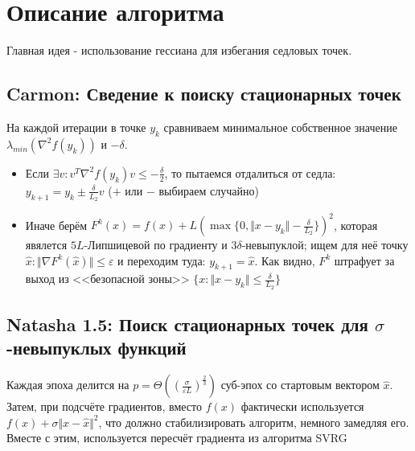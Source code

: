 \documentclass[12pt]{article}
\begin{document}
\section{Описание алгоритма}

Главная идея - использование гессиана для избегания седловых точек.

\subsection{Carmon: Сведение к поиску стационарных точек}



На каждой итерации в точке $y_k$ сравниваем минимальное собственное значение $\lambda_{min}(\nabla^2f(y_k))$ и $- \delta$.
\begin{itemize}
	\item Если $\exists v : v^T \nabla^2f(y_k) v \leq -\frac{\delta}{2} $, то пытаемся отдалиться от седла: $y_{k+1} = y_k \pm \frac{\delta}{L_2}v$ ($+$ или $-$ выбираем случайно)
		
	\item Иначе берём $F^k(x) = f(x) + L(\max\{ 0, \Vert x - y_k \Vert - \frac{\delta}{L_2} \})^2$, которая явялется $5L$-Липшицевой по градиенту и $3\delta$-невыпуклой; ищем для неё точку $\widehat{x} : \Vert \nabla F^k(\widehat{x}) \Vert \leq \varepsilon$ и переходим туда: $y_{k+1} = \widehat{x}$. Как видно, $F^k$ штрафует за выход из <<безопасной зоны>> $\{x : \Vert x - y_k \Vert \leq \frac{\delta}{L_2} \}$
	
\end{itemize}

\subsection{Natasha 1.5: Поиск стационарных точек для $\sigma$-невыпуклых функций}

Каждая эпоха делится на $p = \Theta((\frac{\sigma}{\varepsilon L})^{\frac{2}{3}})$ суб-эпох со стартовым вектором $\widehat{x}$.\\

Затем, при подсчёте градиентов, вместо $f(x)$ фактически используется $f(x) + \sigma \Vert x - \widehat{x} \Vert^2$, что должно стабилизировать алгоритм, немного замедляя его.
Вместе с этим, используется пересчёт градиента из алгоритма SVRG
\end{document}

